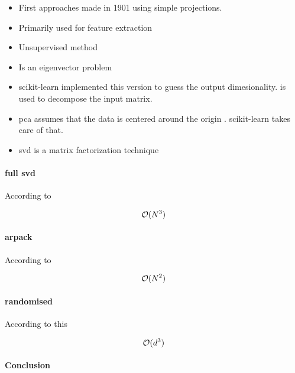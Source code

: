\begin{itemize}
	\item First approaches made in 1901 using simple projections. \cite{pearson1901liii}
	\item Primarily used for feature extraction \cite{PythonMachineLearningCh5}
	\item Unsupervised method \cite{PythonMachineLearningCh5}
	\item Is an eigenvector problem \cite{MultilinearSubspaceLearningCh2}
	\item scikit-learn implemented this version \cite{minka2000automatic} to guess the output dimesionality. \cite{halko2009finding} is used to decompose the input matrix.
	\item \gls{pca} assumes that the data is centered around the origin \cite{HandsOnMLCh8}. scikit-learn takes care of that.
	\item \gls{svd} is a matrix factorization technique \cite{HandsOnMLCh8}
\end{itemize}


\clearpage

\paragraph{full \gls{svd}} \label{svd}

According to \cite{wright2001large}

$$\mathcal{O}(N^3)$$

\clearpage

\paragraph{\gls{arpack}}

According to \cite{wright2001large}

$$\mathcal{O}(N^2)$$

\clearpage

\paragraph{randomised}

According to this \cite{HandsOnMLCh8}

$$\mathcal{O}(d^3)$$


\clearpage

\paragraph{Conclusion}
